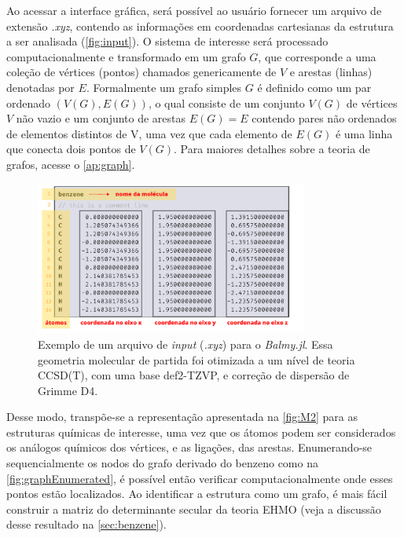 Ao acessar a interface gráfica, será possível ao usuário fornecer um arquivo de extensão \textit{.xyz}, contendo as informações em coordenadas cartesianas da estrutura a ser analisada (\autoref{fig:input}). O sistema de interesse será processado computacionalmente e transformado em um grafo $G$, que corresponde a uma coleção de vértices (pontos) chamados genericamente de $V$ e arestas (linhas) denotadas por $E$. Formalmente um grafo simples $G$ é definido como um par ordenado $(V(G), E(G))$, o qual consiste de um conjunto $V(G)$ de vértices $V$ não vazio e um conjunto de arestas $E(G) = E$ contendo pares não ordenados de elementos distintos de V, uma vez que cada elemento de $E(G)$ é uma linha que conecta dois pontos de $V(G)$. Para maiores detalhes sobre a teoria de grafos, acesse o \autoref{ap:graph}.

\begin{figure}[htb]
	\caption{\label{fig:input} Exemplo de um arquivo de \textit{input} (\textit{.xyz}) para o \textit{Balmy.jl}. Essa geometria molecular de partida foi otimizada a um nível de teoria CCSD(T), com uma base def2-TZVP, e correção de dispersão de Grimme D4.}
	\begin{center}
		\includegraphics[width=0.8\textwidth]{images/fig2(4).png}
	\end{center}
\end{figure}



Desse modo, transpõe-se a representação apresentada na \autoref{fig:M2} para as estruturas químicas de interesse, uma vez que os átomos podem ser considerados os análogos químicos dos vértices, e as ligações, das arestas. Enumerando-se sequencialmente os nodos do grafo derivado do benzeno como na \autoref{fig:graphEnumerated}, é possível então verificar computacionalmente onde esses pontos estão localizados. Ao identificar a estrutura como um grafo, é mais fácil construir a matriz do determinante secular da teoria \gls{EHMO} (veja a discussão desse resultado na \autoref{sec:benzene}). 

